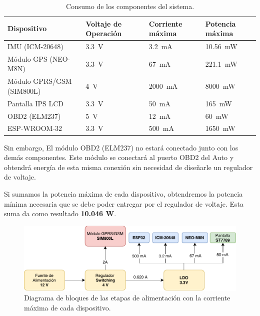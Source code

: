 \bgroup
\def\arraystretch{1.5}%
\begin{table}[htbp!]
\centering
\caption[Consumo de los componentes del sistema]{Consumo de los componentes del sistema.}
\begin{tabular}{@{}lp{2cm}p{2cm}p{2cm}@{}}
\toprule
Dispositivo & Voltaje de Operación & Corriente máxima & Potencia máxima\\ \midrule
IMU (ICM-20648) & \SI{3.3}{V} & \SI{3.2}{\mA} & \SI{10.56}{\mW} \\
Módulo GPS (NEO-M8N) & \SI{3.3}{V} & \SI{67}{mA} & \SI{221,1}{\mW}\\
Módulo GPRS/GSM (SIM800L) & \SI{4}{V} & \SI{2000}{mA} & \SI{8000}{\mW}\\
Pantalla IPS LCD & \SI{3.3}{V} & \SI{50}{mA} & \SI{165}{\mW}\\
OBD2 (ELM237) & \SI{5}{V} & \SI{12}{mA} & \SI{60}{\mW}\\
ESP-WROOM-32 & \SI{3.3}{V} & \SI{500}{mA} & \SI{1650}{\mW}\\ \bottomrule
\end{tabular}
\label{diag:consumo}
\end{table}
\egroup

Sin embargo, El módulo OBD2 (ELM237) no estará conectado junto con los demás componentes. Este módulo se conectará al puerto OBD2 del Auto y obtendrá energía de esta misma conexión sin necesidad de diseñarle un regulador de voltaje.


Si sumamos la potencia máxima de cada dispositivo, obtendremos la potencia mínima necesaria que se debe poder entregar por el regulador de voltaje. Esta suma da como resultado \textbf{10.046 W}.


\begin{figure}[hbtp!]
\centering
\includegraphics[width=\textwidth]{Bloques_Alimentacion.pdf}
\captionsetup{justification=centering,margin=2cm}
\caption{Diagrama de bloques de las etapas de alimentación con la corriente máxima de cada dispositivo.}
\label{fig:bloques_alim}
\end{figure}



